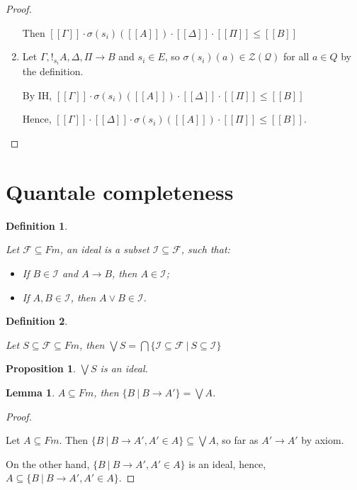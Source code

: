\documentclass[a4paper]{article}
\newtheorem{prop}{Proposition}
\newtheorem{lemma}{Lemma}
\newtheorem{defin}{Definition}
\begin{document}
\begin{proof}
\begin{enumerate}
Then $[\![\Gamma]\!] \cdot \sigma(s_i)([\![A]\!]) \cdot [\![\Delta]\!] \cdot [\![\Pi]\!] \leq [\![B]\!]$

\item Let $\Gamma, !_{s_i} A, \Delta, \Pi \rightarrow B$ and $s_i \in E$, so $\sigma(s_i)(a) \in \mathcal{Z}(\mathcal{Q})$ for all $a \in Q$ by the definition.

By IH, $[\![\Gamma]\!] \cdot \sigma(s_i)([\![A]\!]) \cdot [\![\Delta]\!] \cdot [\![\Pi]\!] \leq [\![B]\!]$

Hence, $[\![\Gamma]\!] \cdot [\![\Delta]\!] \cdot \sigma(s_i)([\![A]\!]) \cdot [\![\Pi]\!] \leq [\![B]\!]$.

\end{enumerate}

\end{proof}

\section{Quantale completeness}

\begin{defin}
$ $

  Let $\mathcal{F} \subseteq Fm$, an ideal is a subset $\mathcal{I} \subseteq \mathcal{F}$, such that:

\begin{itemize}
  \item If $B \in \mathcal{I}$ and $A \rightarrow B$, then $A \in \mathcal{I}$;
  \item If $A, B \in \mathcal{I}$, then $A \lor B \in \mathcal{I}$.
\end{itemize}
\end{defin}

\begin{defin}
$ $

  Let $S \subseteq \mathcal{F} \subseteq Fm$,
  then $\bigvee S = \bigcap \{ \mathcal{I} \subseteq \mathcal{F} \: | \: S \subseteq \mathcal{I} \}$
\end{defin}

\begin{prop}
  $\bigvee S$ is an ideal.
\end{prop}

\begin{lemma}
  $A \subseteq Fm$, then $\{ B \: | \: B \rightarrow A' \} = \bigvee A$.
\end{lemma}

\begin{proof}
$ $

Let $A \subseteq Fm$. Then $\{ B \: | \: B \rightarrow A', A' \in A \} \subseteq \bigvee A$, so far as $A' \rightarrow A'$ by axiom.

On the other hand, $\{ B \: | \: B \rightarrow A', A' \in A \}$ is an ideal, hence, $A \subseteq \{ B \: | \: B \rightarrow A', A' \in A \}$.
\end{proof}
\end{document}
